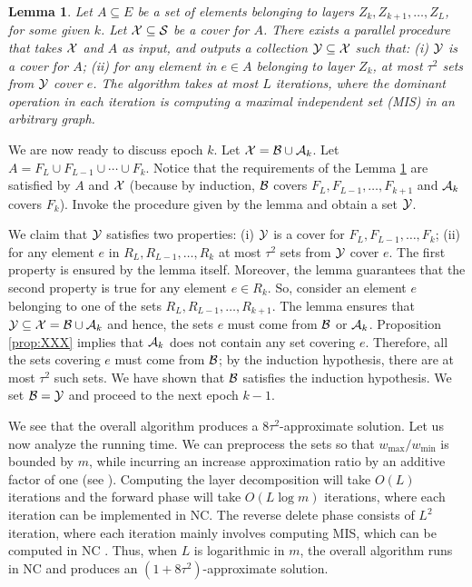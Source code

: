 \documentclass[11pt]{article}
\newtheorem{lemma}[theorem]{\bf Lemma}
\newcommand{\calA} {{\cal A}}
\newcommand{\calB} {{\cal B}}
\newcommand{\calS} {{\cal S}}
\newcommand{\calY} {{\cal Y}}
\newcommand{\calX} {{\cal X}}
\begin{document}
\begin{lemma}
\label{lem:HHH}
Let $A\subseteq E$ be a set of elements belonging to layers $Z_k, Z_{k+1}, \ldots, Z_L$, for some given $k$.
Let $\calX\subseteq \calS$ be a cover for $A$.
There exists a parallel procedure that takes $\calX$ and $A$ as input, and outputs a collection $\calY\subseteq \calX$
such that: (i) $\calY$ is a cover for $A$; (ii) for any element in $e\in A$ belonging to layer $Z_k$,
at most $\tau^2$ sets from $\calY$ cover $e$. 
The algorithm takes at most $L$ iterations, where the dominant operation
in each iteration is computing a maximal independent set (MIS) in an arbitrary graph.
\end{lemma}

We are now ready to discuss epoch $k$. Let $\calX = \calB \cup \calA_k$. 
Let $A=F_L\cup F_{L-1} \cup \cdots \cup  F_k$.
Notice that the requirements of the Lemma \ref{lem:HHH} are satisfied by $A$ and $\calX$
(because by induction, $\calB$ covers $F_L, F_{L-1}, \ldots, F_{k+1}$ and 
$\calA_k$ covers $F_k$).
Invoke the procedure given by the lemma and obtain a set $\calY$. 

We claim that $\calY$ satisfies two properties: 
(i) $\calY$ is a cover for $F_L, F_{L-1}, \ldots, F_k$;
(ii) for any element $e$ in $R_L, R_{L-1}, \ldots, R_k$ at most $\tau^2$ sets from $\calY$ cover $e$.
The first property is ensured by the lemma itself.
Moreover, the lemma guarantees that the second property is true for any element $e\in R_k$. 
So, consider an element $e$ belonging to one of the sets $R_L, R_{L-1}, \ldots, R_{k+1}$.
The lemma ensures that $\calY \subseteq \calX = \calB\cup \calA_k$
and hence, the sets $e$ must come from $\calB$ or $\calA_k$.
Proposition \ref{prop:XXX} implies that $\calA_k$ does not contain any set covering $e$.
Therefore, all the sets covering $e$ must come from $\calB$; by the induction hypothesis,
there are at most $\tau^2$ such sets.
We have shown that $\calB$ satisfies the induction hypothesis.
We set $\calB = \calY$ and proceed to the next epoch $k-1$.

We see that the overall algorithm produces a $8\tau^2$-approximate solution.
Let us now analyze the running time.
We can preprocess the sets so that $w_{\max}/w_{\min}$ is bounded by $m$, while incurring an increase approximation ratio by an additive factor of one (see \cite{RV}).
Computing the layer decomposition will take $O(L)$ iterations and 
the forward phase will take $O(L\log m)$ iterations, where each iteration can be implemented in NC.
The reverse delete phase consists of $L^2$ iteration, where each iteration mainly involves
computing MIS, which can be computed in NC \cite{Luby}.
Thus, when $L$ is logarithmic in $m$, the overall algorithm runs in NC and produces an $(1+8\tau^2)$-approximate solution.
\end{document}
